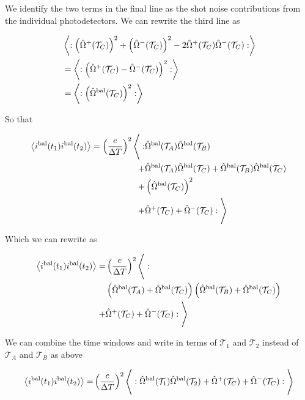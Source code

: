 \documentclass[12pt]{article}
\newcommand{\mc}[1]{\mathcal{#1}}
\begin{document}
We identify the two terms in the final line as the shot noise contributions from the individual photodetectors. We can rewrite the third line as

\begin{align}
&\Braket{:\left(\hat{\Omega}^+(\mc{T}_C)\right)^2 + \left(\hat{\Omega}^-(\mc{T}_C)\right)^2 - 2 \hat{\Omega}^+(\mc{T}_C) \hat{\Omega}^-(\mc{T}_C):}\\
&= \Braket{:\left(\hat{\Omega}^+(\mc{T}_C) - \hat{\Omega}^-(\mc{T}_C)\right)^2 :}\\
&= \Braket{:\left(\hat{\Omega}^{\text{bal}}(\mc{T}_C) \right)^2 :}
\end{align}

So that

\begin{align}
\Braket{i^{\text{bal}}(t_1)i^{\text{bal}}(t_2)} = \left(\frac{e}{\Delta T}\right)^2 \Bigg \langle: &\hat{\Omega}^{\text{bal}}(\mc{T}_A) \hat{\Omega}^{\text{bal}}(\mc{T}_B)\\
+ &\hat{\Omega}^{\text{bal}}(\mc{T}_A) \hat{\Omega}^{\text{bal}}(\mc{T}_C) + \hat{\Omega}^{\text{bal}}(\mc{T}_B) \hat{\Omega}^{\text{bal}}(\mc{T}_C)\\
+ &\left(\hat{\Omega}^{\text{bal}}(\mc{T}_C) \right)^2\\
+&\hat{\Omega}^+(\mc{T}_C) + \hat{\Omega}^-(\mc{T}_C)
:\Bigg \rangle
\end{align}

Which we can rewrite as

\begin{align}
\Braket{i^{\text{bal}}(t_1)i^{\text{bal}}(t_2)} =& \left(\frac{e}{\Delta T}\right)^2 \Bigg \langle:\\
&\left(\hat{\Omega}^{\text{bal}}(\mc{T}_A) + \hat{\Omega}^{\text{bal}}(\mc{T}_C) \right)\left(\hat{\Omega}^{\text{bal}}(\mc{T}_B) + \hat{\Omega}^{\text{bal}}(\mc{T}_C)  \right)\\
+&\hat{\Omega}^+(\mc{T}_C) + \hat{\Omega}^-(\mc{T}_C)
:\Bigg \rangle
\end{align}

We can combine the time windows and write in terms of $\mc{T}_1$ and $\mc{T}_2$ instead of $\mc{T}_A$ and $\mc{T}_B$ as above

\begin{align}
\Braket{i^{\text{bal}}(t_1)i^{\text{bal}}(t_2)} =& \left(\frac{e}{\Delta T}\right)^2 \Bigg \langle: \hat{\Omega}^{\text{bal}}(\mc{T}_1) \hat{\Omega}^{\text{bal}}(\mc{T}_2)
+\hat{\Omega}^+(\mc{T}_C) + \hat{\Omega}^-(\mc{T}_C)
:\Bigg \rangle\\
\end{align}
\end{document}
